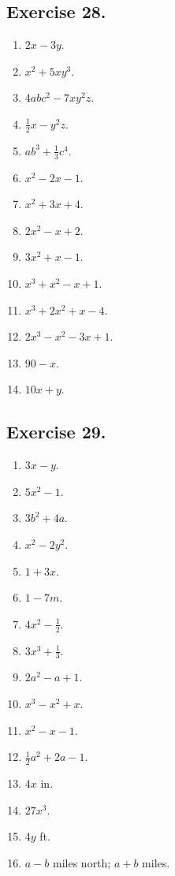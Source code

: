 \documentclass{book}
\begin{document}
\subsection*{Exercise 28.}
\begin{enumerate}

\item $2x - 3y$.

\item $x^2 + 5xy^3$.

\item $4abc^2 - 7xy^2z$.

\item $\frac{1}{2} x - y^2z$.

\item $ab^3 + \frac{1}{3}c^4$.

\item  $x^2 - 2x - 1$.

\item $x^2 + 3x + 4$.

\item $2x^2 - x + 2$.

\item $3x^2 + x - 1$.

\item $x^3 + x^2 - x + 1$.

\item $x^3 + 2x^2 + x - 4$.

\item $2x^3 - x^2 - 3x + 1$.

\item $90 - x$.

\item $10x + y$.
\end{enumerate}


\subsection*{Exercise 29.}


\begin{enumerate}
\item $3x-y$.
\item $5x^2-1$.
\item $3b^2+4a$.
\item $x^2-2y^2$.
\item $1+3x$.
\item $1-7m$.
\item $4x^2-\frac{1}{2}$.
\item $3x^3+\frac{1}{3}$.
\item $2a^2-a+1$.
\item $x^3-x^2+x$.
\item $x^2-x-1$.
\item $\frac{1}{2}a^2+2a-1$.
\item $4x$ in.
\item $27x^3$.
\item $4y$ ft.
\item $a-b$ miles north; $a+b$ miles.
\end{enumerate}
\end{document}
